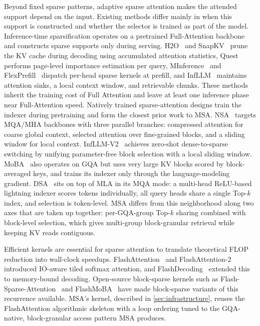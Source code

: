 \documentclass{llmxive}
\providecommand{\method}{\textsc{MSA}}
\begin{document}
Beyond fixed sparse patterns, adaptive sparse attention makes the attended support depend on the input. 
Existing methods differ mainly in when this support is constructed and whether the selector is trained as part of the model. 
Inference-time sparsification operates on a pretrained Full-Attention backbone and constructs sparse supports only during serving. H2O~\citep{zhang2023h2o} and SnapKV~\citep{li2024snapkv} prune the KV cache during decoding using accumulated attention statistics, Quest~\citep{tang2024quest} performs page-level importance estimation per query, MInference~\citep{jiang2024minference} and FlexPrefill~\citep{lai2025flexprefill} dispatch per-head sparse kernels at prefill, and InfLLM~\citep{xiao2024infllm} maintains attention sinks, a local context window, and retrievable chunks. These methods inherit the training cost of Full Attention and leave at least one inference phase near Full-Attention speed. Natively trained sparse-attention designs train the indexer during pretraining and form the closest prior work to \method{}. NSA~\citep{yuan2025nsa} targets MQA/MHA backbones with three parallel branches: compressed attention for coarse global context, selected attention over fine-grained blocks, and a sliding window for local context. InfLLM-V2~\citep{zhao2025infllmv2} achieves zero-shot dense-to-sparse switching by unifying parameter-free block selection with a local sliding window. MoBA~\citep{lu2025mobamixtureblockattention} also operates on GQA but uses very large KV blocks scored by block-averaged keys, and trains its indexer only through the language-modeling gradient. DSA~\citep{deepseekai2025deepseekv32pushingfrontieropen} sits on top of MLA in its MQA mode: a multi-head ReLU-based lightning indexer scores tokens individually, all query heads share a single Top-$k$ index, and selection is token-level.
\method{} differs from this neighborhood along two axes that are taken up together: per-GQA-group Top-$k$ sharing combined with block-level selection, which gives multi-group block-granular retrieval while keeping KV reads contiguous.

Efficient kernels are essential for sparse attention to translate theoretical FLOP reduction into wall-clock speedups. FlashAttention~\citep{dao2022flashattention} and FlashAttention-2~\citep{dao2023flashattention2} introduced IO-aware tiled softmax attention, and FlashDecoding~\citep{dao2023flashdecoding} extended this to memory-bound decoding. Open-source block-sparse kernels such as Flash-Sparse-Attention~\citep{yan2025fsa} and FlashMoBA~\citep{xiao2025flashmoba} have made block-sparse variants of this recurrence available. \method{}'s kernel, described in \cref{sec:infrastructure}, reuses the FlashAttention algorithmic skeleton with a loop ordering tuned to the GQA-native, block-granular access pattern \method{} produces.
\end{document}

